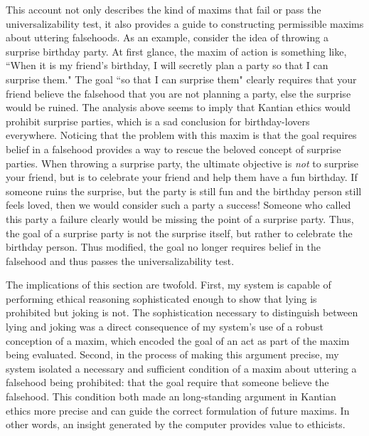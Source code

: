 \begin{isabellebody}
\begin{isamarkuptext}
This account not only describes the kind of maxims that fail or pass the universalizability test, it 
also provides a guide to constructing permissible maxims about uttering falsehoods. As an example, 
consider the idea of throwing a surprise birthday party. At first glance, the maxim of action is 
something like, ``When it is my friend's birthday, I will secretly plan a party so that I can surprise
them." The goal ``so that I can surprise them" clearly requires that your friend believe the falsehood that 
you are not planning a party, else the surprise would be ruined. The analysis above seems to imply that 
Kantian ethics would prohibit surprise parties, which is a sad conclusion for birthday-lovers everywhere. 
Noticing that the problem with this maxim is that the goal requires belief
in a falsehood provides a way to rescue the beloved concept of surprise parties. When throwing a 
surprise party, the ultimate objective is \emph{not} to surprise your friend, but is to celebrate
your friend and help them have a fun birthday. If someone ruins the surprise, but the party is still fun
and the birthday person still feels loved, then we would consider such a party a success! Someone who
called this party a failure clearly would be missing the point of a surprise party. Thus, the goal of 
a surprise party is not the surprise itself, but rather to celebrate the birthday person. Thus modified, 
the goal no longer requires belief in the falsehood and thus passes the universalizability test. 

The implications of this section are twofold. First, my system is capable of performing ethical reasoning
sophisticated enough to show that lying is prohibited but joking is not. The sophistication
necessary to distinguish between lying and joking was a direct consequence of my system's use of a robust
conception of a maxim, which encoded the goal of an act as part of the maxim being evaluated. Second, 
in the process of making this argument precise, my system isolated a necessary and sufficient condition 
of a maxim about uttering a falsehood being prohibited: that the goal require that someone believe
the falsehood. This condition both made an long-standing argument in Kantian ethics more precise
and can guide the correct formulation of future maxims. In other words, an insight generated by the 
computer provides value to ethicists. 


\end{isamarkuptext}
\end{isabellebody}
